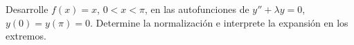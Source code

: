 Desarrolle $f(x)=x$, $0<x<\pi$, en las autofunciones de $y''+\lambda y=0$, $y(0)=y(\pi)=0$. Determine la normalización e interprete la expansión en los extremos.
